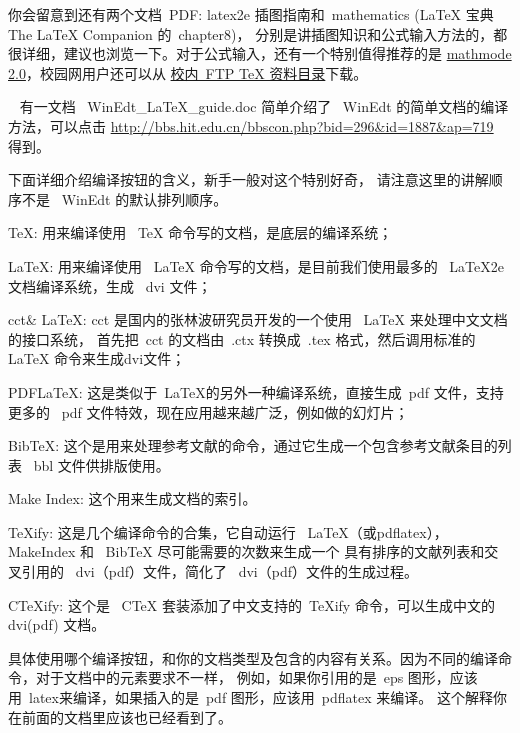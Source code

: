 你会留意到还有两个文档~PDF: latex2e 插图指南和~mathematics (LaTeX 宝典 The LaTeX Companion 的~chapter8)，
分别是讲插图知识和公式输入方法的，都很详细，建议也浏览一下。对于公式输入，还有一个特别值得推荐的是
\href{http://www.tug.org/tex-archive/info/math/voss/mathmode/}{mathmode 2.0}，校园网用户还可以从
\href{ftp://202.118.224.241/software/Science/TeX&LaTeX/}{校内~FTP TeX 资料目录}下载。

\label{sec:winedttricks}
~
有一文档~ WinEdt\_LaTeX\_guide.doc 简单介绍了~ WinEdt 的简单文档的编译方法，可以点击
\url{http://bbs.hit.edu.cn/bbscon.php?bid=296&id=1887&ap=719} 得到。

下面详细介绍编译按钮的含义，新手一般对这个特别好奇，
请注意这里的讲解顺序不是~ WinEdt 的默认排列顺序。
\begin{hitlist}
  \item TeX: 用来编译使用~ TeX 命令写的文档，是底层的编译系统；
  \item LaTeX: 用来编译使用~ LaTeX 命令写的文档，是目前我们使用最多的~ LaTeX2e 文档编译系统，生成~ dvi 文件；
  \item cct\& LaTeX: cct 是国内的张林波研究员开发的一个使用~ LaTeX 来处理中文文档的接口系统，
  首先把~cct 的文档由~.ctx 转换成~.tex 格式，然后调用标准的~ LaTeX 命令来生成dvi文件；
  \item PDFLaTeX: 这是类似于~LaTeX的另外一种编译系统，直接生成~pdf 文件，支持更多的~ pdf 文件特效，现在应用越来越广泛，例如做的幻灯片；
  \item BibTeX: 这个是用来处理参考文献的命令，通过它生成一个包含参考文献条目的列表~ bbl 文件供排版使用。
  \item Make Index: 这个用来生成文档的索引。
  \item TeXify: 这是几个编译命令的合集，它自动运行~ LaTeX（或pdflatex），MakeIndex 和~ BibTeX 尽可能需要的次数来生成一个
  具有排序的文献列表和交叉引用的~ dvi（pdf）文件，简化了~ dvi（pdf）文件的生成过程。
  \item CTeXify: 这个是~ CTeX 套装添加了中文支持的~TeXify 命令，可以生成中文的~ dvi(pdf) 文档。
\end{hitlist}

具体使用哪个编译按钮，和你的文档类型及包含的内容有关系。因为不同的编译命令，对于文档中的元素要求不一样，
例如，如果你引用的是~eps 图形，应该用~latex来编译，如果插入的是~pdf 图形，应该用~pdflatex 来编译。
这个解释你在前面的文档里应该也已经看到了。


